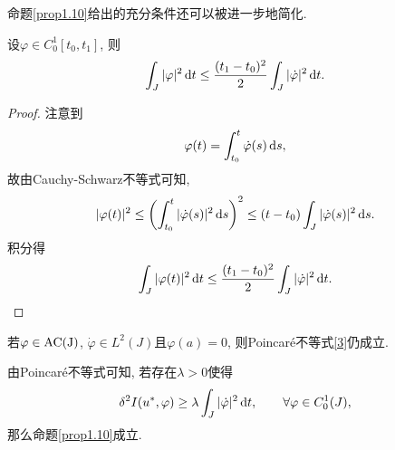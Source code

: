 命题\ref{prop1.10}给出的充分条件还可以被进一步地简化.

\begin{lemma}[Poincaré不等式]\label{lma1.12}
    设$\varphi \in C_0^1[t_0, t_1]$, 则 
    \begin{equation}\label{3}
        \int_J|\varphi|^2 \,{\rm d}t \leq \frac{(t_1 - t_0)^2}{2}\int_J|\dot\varphi|^2 \,{\rm d}t.
    \end{equation}
    \begin{proof}
        注意到
        \begin{equation*}
            \varphi(t) = \int_{t_0}^t\dot\varphi(s) \,{\rm d}s,
        \end{equation*}
        故由Cauchy-Schwarz不等式可知, 
        \begin{equation*}
            |\varphi(t)|^2 \leq \left(\int_{t_0}^t|\dot\varphi(s)|^2 \,{\rm d}s\right)^2 \leq (t - t_0)\int_J|\dot\varphi(s)|^2 \,{\rm d}s.
        \end{equation*}
        积分得 
        \begin{equation*}
            \int_J|\varphi(t)|^2 \,{\rm d}t \leq \frac{(t_1 - t_0)^2}{2}\int_J|\dot\varphi|^2 \,{\rm d}t.
        \end{equation*}
    \end{proof}
\end{lemma}

\begin{remark}
    若$\varphi \in {\rm AC(J)}$, $\dot\varphi \in L^2(J)$且$\varphi(a) = 0$, 则Poincaré不等式\eqref{3}仍成立.
\end{remark}

由Poincaré不等式可知, 若存在$\lambda > 0$使得
\begin{equation*}
    \delta^2I(u^*, \varphi) \geq \lambda\int_J|\dot\varphi|^2 \,{\rm d}t, \qquad \forall \varphi \in C_0^1(J),
\end{equation*}
那么命题\ref{prop1.10}成立.

